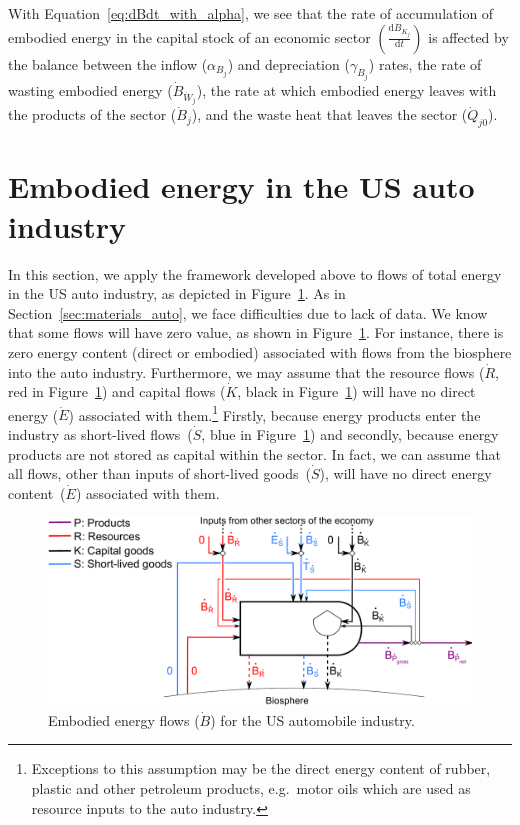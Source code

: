 With Equation~\ref{eq:dBdt_with_alpha}, we see that
the rate of accumulation of embodied energy
in the capital stock of an economic sector
$\left( \frac{\mathrm{d}B_{K_{j}}}{\mathrm{d}t} \right)$
is affected by the balance between the inflow ($\alpha_{B_{j}}$) 
and depreciation ($\gamma_{B_{j}}$) rates, the rate of wasting
embodied energy ($\dot{B}_{\dot{W}_{j}}$), 
the rate at which embodied energy leaves with the products 
of the sector ($\dot{B}_{j}$), 
and the waste heat that leaves the sector ($\dot{Q}_{j0}$).


\section{Embodied energy in the US auto industry}
\label{sec:embodied_energy_auto}

In this section,
we apply the framework developed above to flows of
total energy in the US auto industry,
as depicted in Figure~\ref{fig:PERKS_embodied_auto}.
As in Section~\ref{sec:materials_auto},
we face difficulties due to lack of data.
We know that some flows will have zero value,
as shown in Figure~\ref{fig:PERKS_embodied_auto}.
For instance, there is zero energy content
(direct or embodied) associated with
flows from the biosphere into the auto industry.
Furthermore,
we may assume that the
resource flows ($\dot{R}$, red in Figure~\ref{fig:PERKS_embodied_auto})
and capital flows ($\dot{K}$, black in Figure~\ref{fig:PERKS_embodied_auto}) 
will have no direct energy ($\dot{E}$)
associated with them.\footnote{Exceptions
	to this assumption may be the direct energy content
	of rubber, plastic and other petroleum products,
	e.g.\ motor oils which are used as resource
	inputs to the auto industry.}
Firstly,
because energy products enter the industry 
as short-lived flows~($\dot{S}$, blue in Figure~\ref{fig:PERKS_embodied_auto}) 
and secondly,
because energy products are not stored
as capital within the sector.
In fact,
we can assume that all flows,
other than inputs of short-lived
goods~($\dot{S}$),
will have no direct energy content~($\dot{E}$) 
associated with them.

\begin{figure}[!ht]
\centering
\includegraphics[width=\linewidth]{Part_1/Chapter_Embodied/images/PERKS_basic_unit_embodied_energy_content_auto_ind.pdf}
\caption[Embodied energy flows for the US automobile industry]{Embodied energy flows ($\dot{B}$) for the US automobile industry.}
\label{fig:PERKS_embodied_auto}
\end{figure}

